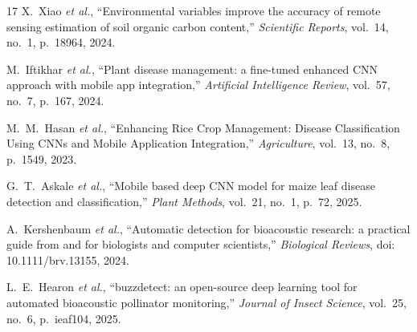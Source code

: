 \documentclass[10pt,a4paper,twocolumn]{IEEEtran}
\begin{document}
\begin{thebibliography}{17}
X.~Xiao \emph{et al.}, ``Environmental variables improve the accuracy of remote sensing estimation of soil organic carbon content,'' \emph{Scientific Reports}, vol.~14, no.~1, p.~18964, 2024.

M.~Iftikhar \emph{et al.}, ``Plant disease management: a fine-tuned enhanced CNN approach with mobile app integration,'' \emph{Artificial Intelligence Review}, vol.~57, no.~7, p.~167, 2024.

M.~M.~Hasan \emph{et al.}, ``Enhancing Rice Crop Management: Disease Classification Using CNNs and Mobile Application Integration,'' \emph{Agriculture}, vol.~13, no.~8, p.~1549, 2023.

G.~T.~Askale \emph{et al.}, ``Mobile based deep CNN model for maize leaf disease detection and classification,'' \emph{Plant Methods}, vol.~21, no.~1, p.~72, 2025.

A.~Kershenbaum \emph{et al.}, ``Automatic detection for bioacoustic research: a practical guide from and for biologists and computer scientists,'' \emph{Biological Reviews}, doi: 10.1111/brv.13155, 2024.

L.~E.~Hearon \emph{et al.}, ``buzzdetect: an open-source deep learning tool for automated bioacoustic pollinator monitoring,'' \emph{Journal of Insect Science}, vol.~25, no.~6, p.~ieaf104, 2025.
\end{thebibliography}
\end{document}
